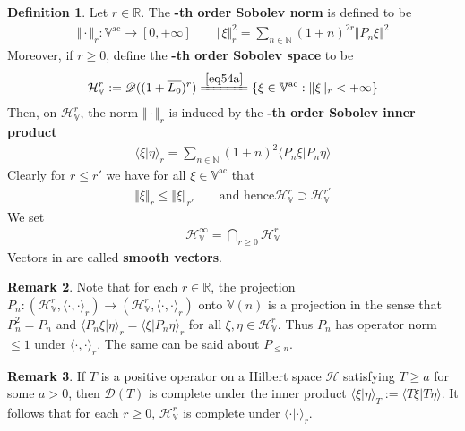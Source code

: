\documentclass[12pt,b5paper,notitlepage]{article}
\theoremstyle{definition}
\newtheorem{df}{Definition}[section]
\newtheorem{rem}[df]{Remark}
\theoremstyle{plain}
\newcommand{\mc}{\mathcal}
\newcommand{\ovl}{\overline}
\newcommand{\Dom}{\scr{D}}
\newcommand{\bk}[1]{\langle {#1}\rangle}
\newcommand{\scr}{\mathscr}
\newcommand{\Vbb}{\mathbb V}
\newcommand{\Nbb}{\mathbb N}
\newcommand{\Rbb}{\mathbb R}
\newcommand{\HV}{\mathcal H_{\mathbb V}}
\newcommand{\ac}{\mathrm{ac}}
\numberwithin{equation}{section}
\begin{document}
\begin{df}
Let $r\in\Rbb$. The \textbf{-th order Sobolev norm}  is defined to be
\begin{gather*}
\Vert\cdot\Vert_r:\Vbb^\ac\rightarrow[0,+\infty]\qquad \big\Vert\xi\big\Vert_r^2=\sum_{n\in\Nbb}(1+n)^{2r}\Vert P_n\xi\Vert^2
\end{gather*}
Moreover, if $r\geq0$, define the \textbf{-th order Sobolev space} to be \index{HV@$\mc H_\Vbb^r,\HV^\infty$} 
\begin{align*}
\mc H_\Vbb^r:=\Dom((1+\ovl {L_0})^r)\xlongequal{\eqref{eq54a}} \{\xi\in\Vbb^\ac:\Vert\xi\Vert_r<+\infty\}
\end{align*}
Then, on $\HV^r$, the norm $\Vert\cdot\Vert_r$ is induced by the \textbf{-th order Sobolev inner product} 
\begin{align*}
\bk{\xi|\eta}_r=\sum_{n\in\Nbb}(1+n)^{2}\bk{P_n\xi|P_n\eta}
\end{align*}
Clearly for $r\leq r'$ we have for all $\xi\in\Vbb^\ac$ that
\begin{align*}
\Vert\xi\Vert_r\leq\Vert\xi\Vert_{r'} \qquad\text{and hence} \HV^r\supset\HV^{r'}
\end{align*}
We set
\begin{align*}
\HV^\infty=\bigcap_{r\geq0}\HV^r
\end{align*}
Vectors in \pmb{$\HV^\infty$} are called \textbf{smooth vectors}. 
\end{df}

\begin{rem}\label{lb37}
Note that for each $r\in\Rbb$, the projection $P_n:(\HV^r,\bk{\cdot,\cdot}_r)\rightarrow (\HV^r,\bk{\cdot,\cdot}_r)$ onto $\Vbb(n)$ is a projection in the sense that $P_n^2=P_n$ and $\bk{P_n\xi|\eta}_r=\bk{\xi|P_n\eta}_r$ for all $\xi,\eta\in\HV^r$. Thus $P_n$ has operator norm $\leq 1$ under $\bk{\cdot,\cdot}_r$. The same can be said about $P_{\leq n}$.
\end{rem}


\begin{rem}\label{lb51}
If $T$ is a positive operator on a Hilbert space $\mc H$ satisfying $T\geq a$ for some $a>0$, then $\Dom(T)$ is complete under the inner product $\bk{\xi|\eta}_T:=\bk{T\xi|T\eta}$. It follows that for each $r\geq0$, $\HV^r$ is complete under $\bk{\cdot|\cdot}_r$.
\end{rem}
\end{document}
